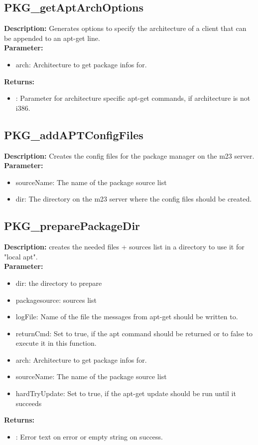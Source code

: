 \subsection{PKG\_getAptArchOptions}
\textbf{Description:} Generates options to specify the architecture of a client that can be appended to an apt-get line.\\
\textbf{Parameter:}
\begin{itemize}
\item arch: Architecture to get package infos for.
\end{itemize}
\textbf{Returns:}
\begin{itemize}
\item : Parameter for architecture specific apt-get commands, if architecture is not i386.
\end{itemize}

\subsection{PKG\_addAPTConfigFiles}
\textbf{Description:} Creates the config files for the package manager on the m23 server.\\
\textbf{Parameter:}
\begin{itemize}
\item sourceName: The name of the package source list
\item dir: The directory on the m23 server where the config files should be created.
\end{itemize}

\subsection{PKG\_preparePackageDir}
\textbf{Description:} creates the needed files + sources list in a directory to use it for "local apt".\\
\textbf{Parameter:}
\begin{itemize}
\item dir: the directory to prepare
\item packagesource: sources list
\item logFile: Name of the file the messages from apt-get should be written to.
\item returnCmd: Set to true, if the apt command should be returned or to false to execute it in this function.
\item arch: Architecture to get package infos for.
\item sourceName: The name of the package source list
\item hardTryUpdate: Set to true, if the apt-get update should be run until it succeeds
\end{itemize}
\textbf{Returns:}
\begin{itemize}
\item : Error text on error or empty string on success.
\end{itemize}

